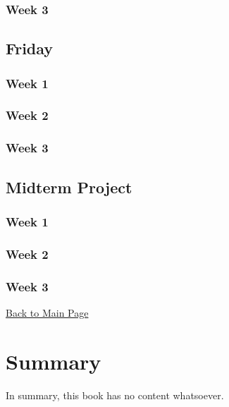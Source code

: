 \documentclass[
  letterpaper,
  DIV=11,
  numbers=noendperiod]{scrreprt}
\begin{document}
\subsection{Week 3}\label{week-3-8}

\section{Friday}\label{friday-3}

\subsection{Week 1}\label{week-1-10}

\subsection{Week 2}\label{week-2-10}

\subsection{Week 3}\label{week-3-9}

\section{Midterm Project}\label{midterm-project-3}

\subsection{Week 1}\label{week-1-11}

\subsection{Week 2}\label{week-2-11}

\subsection{Week 3}\label{week-3-10}

\href{introduction.html}{Back to Main Page}


\chapter{Summary}\label{summary}

In summary, this book has no content whatsoever.
\end{document}
